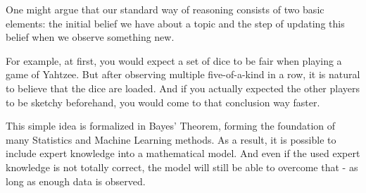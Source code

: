 
One might argue that our standard way of reasoning consists of two basic elements:
the initial belief we have about a topic and the step of updating this belief when we observe something new.

For example, at first, you would expect a set of dice to be fair when playing a game of Yahtzee. But after observing multiple five-of-a-kind in a row, it is natural to believe that the dice are loaded.
And if you actually expected the other players to be sketchy beforehand, you would come to that conclusion way faster.

This simple idea is formalized in Bayes' Theorem, forming the foundation of many Statistics and Machine Learning methods.
As a result, it is possible to include expert knowledge into a mathematical model.
And even if the used expert knowledge is not totally correct, the model will still be able to overcome that - as long as enough data is observed.

